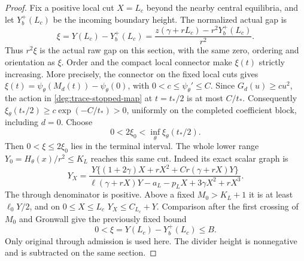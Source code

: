 \begin{proof}
Fix a positive local cut \(X=L_c\) beyond the nearby central
equilibria, and let \(Y_b^+(L_c)\) be the incoming boundary
height.  The normalized actual gap is
\begin{equation}\label{deg:trace-actual-gap}
 \xi=Y(L_c)-Y_b^+(L_c)
 =\frac{z(\gamma+rL_c)-r^2Y_b^+(L_c)}{r^2}.
\end{equation}
Thus \(r^2\xi\) is the actual raw gap on this section, with the
same zero, ordering and orientation as \(\xi\).
Order and the compact local connector make \(\xi(t)\) strictly
increasing. More precisely, the connector on the fixed local cuts
gives \(\xi(t)=\psi_\theta(M_d(t))-\psi_\theta(0)\), with
\(0<c\le\psi_\theta'\le C\). Since \(G_d(u)\ge cu^2\),
the action in \eqref{deg:trace-stopped-map} at \(t=t_*/2\) is
at most \(C/t_*\). Consequently
\(\xi_\theta(t_*/2)\ge c\exp(-C/t_*)>0\), uniformly on the
completed coefficient block, including \(d=0\). Choose
\begin{equation}\label{deg:trace-overlap}
 0<2\xi_0<\inf_\theta\xi_\theta(t_*/2).
\end{equation}
Then \(0<\xi\le2\xi_0\) lies in the terminal interval.
The whole lower range \(Y_0=H_\theta(x)/r^2\le K_L\) reaches this
same cut. Indeed its exact scalar graph is
\begin{equation}\label{sharp:upper-trace-barrier}
 Y_X=\frac{Y\{(1+2\gamma)X+rX^2+Cr(\gamma+rX)Y\}}
 {\ell(\gamma+rX)Y-a_L-p_LX+3\gamma X^2+rX^3}.
\end{equation}
The through denominator is positive. Above a fixed \(M_0>K_L+1\)
it is at least \(\ell_0Y/2\), and on \(0\le X\le L_c\)
\(Y_X\le C_{L_c}+Y\). Comparison after the first crossing of \(M_0\)
and Gronwall give the previously fixed bound
\begin{equation}\label{sharp:upper-trace-bounded-gap}
 0<\xi=Y(L_c)-Y_b^+(L_c)\le B.
\end{equation}
Only original through admission is used here. The divider height is
nonnegative and is subtracted on the same section.


\end{proof}
